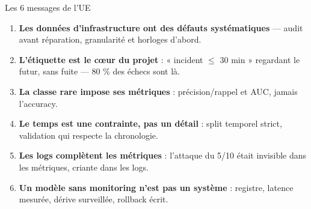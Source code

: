 \begin{frame}{Les 6 messages de l'UE}
\begin{kbox}
\begin{enumerate}
\item \textbf{Les données d'infrastructure ont des défauts systématiques} ---
audit avant réparation, granularité et horloges d'abord.
\item \textbf{L'étiquette est le cœur du projet} : « incident $\le$ 30 min »
regardant le futur, sans fuite --- 80 \% des échecs sont là.
\item \textbf{La classe rare impose ses métriques} : précision/rappel et
AUC, jamais l'accuracy.
\item \textbf{Le temps est une contrainte, pas un détail} : split temporel
strict, validation qui respecte la chronologie.
\item \textbf{Les logs complètent les métriques} : l'attaque du 5/10 était
invisible dans les métriques, criante dans les logs.
\item \textbf{Un modèle sans monitoring n'est pas un système} : registre,
latence mesurée, dérive surveillée, rollback écrit.
\end{enumerate}
\end{kbox}
\end{frame}

